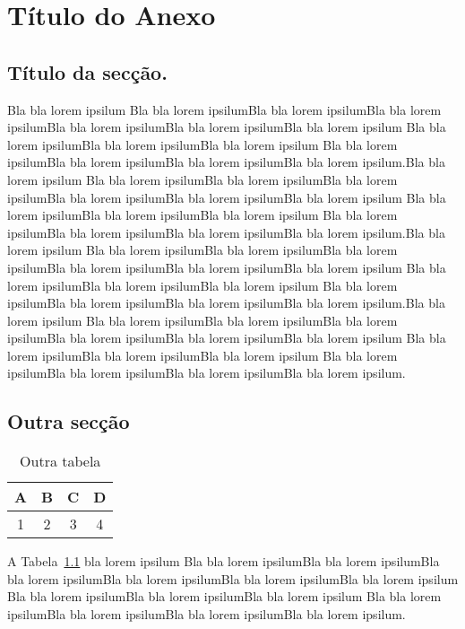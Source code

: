 \chapter{Título do Anexo}

\section{Título da secção.}\label{ax:anexoA}

Bla bla lorem ipsilum Bla bla lorem ipsilumBla bla lorem ipsilumBla bla
lorem ipsilumBla bla lorem ipsilumBla bla lorem ipsilumBla bla lorem
ipsilum Bla bla lorem ipsilumBla bla lorem ipsilumBla bla lorem ipsilum
Bla bla lorem ipsilumBla bla lorem ipsilumBla bla lorem ipsilumBla bla
lorem ipsilum.Bla bla lorem ipsilum Bla bla lorem ipsilumBla bla lorem ipsilumBla bla
lorem ipsilumBla bla lorem ipsilumBla bla lorem ipsilumBla bla lorem
ipsilum Bla bla lorem ipsilumBla bla lorem ipsilumBla bla lorem ipsilum
Bla bla lorem ipsilumBla bla lorem ipsilumBla bla lorem ipsilumBla bla
lorem ipsilum.Bla bla lorem ipsilum Bla bla lorem ipsilumBla bla lorem ipsilumBla bla
lorem ipsilumBla bla lorem ipsilumBla bla lorem ipsilumBla bla lorem
ipsilum Bla bla lorem ipsilumBla bla lorem ipsilumBla bla lorem ipsilum
Bla bla lorem ipsilumBla bla lorem ipsilumBla bla lorem ipsilumBla bla
lorem ipsilum.Bla bla lorem ipsilum Bla bla lorem ipsilumBla bla lorem ipsilumBla bla
lorem ipsilumBla bla lorem ipsilumBla bla lorem ipsilumBla bla lorem
ipsilum Bla bla lorem ipsilumBla bla lorem ipsilumBla bla lorem ipsilum
Bla bla lorem ipsilumBla bla lorem ipsilumBla bla lorem ipsilumBla bla
lorem ipsilum.



\section{Outra secção}

\begin{table}
  {\centering
  \begin{tabular}{c|c|c|c}
    A & B & C & D\\    \hline
    1 & 2 & 3 & 4\\ \hline \hline
  \end{tabular}\caption{Outra  tabela}\label{tab:outratabela}
  \par}
\end{table}


A Tabela~\ref{tab:outratabela} bla lorem ipsilum Bla bla lorem ipsilumBla bla lorem ipsilumBla bla
lorem ipsilumBla bla lorem ipsilumBla bla lorem ipsilumBla bla lorem
ipsilum Bla bla lorem ipsilumBla bla lorem ipsilumBla bla lorem ipsilum
Bla bla lorem ipsilumBla bla lorem ipsilumBla bla lorem ipsilumBla bla
lorem ipsilum.
